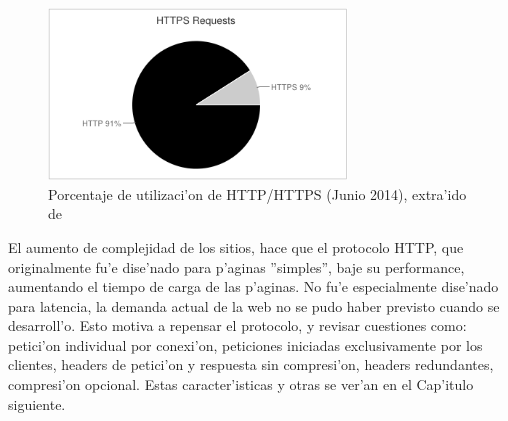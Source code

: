 \begin{figure}[h]
  	\centering
	\includegraphics[width=300px]{img/httphttps2014}
	\caption{\small Porcentaje de utilizaci'on de HTTP/HTTPS (Junio 2014), extra'ido de \cite{httparchive}}
	\label{httphttps2014}
\end{figure}

\clearpage

El aumento de complejidad de los sitios, hace que el protocolo HTTP, que originalmente fu'e dise'nado para p'aginas ''simples'', baje su performance, aumentando el tiempo de carga de las p'aginas. No fu'e especialmente dise'nado para latencia, la demanda actual de la web no se pudo haber previsto cuando se desarroll'o. Esto motiva a repensar el protocolo, y revisar cuestiones como: petici'on individual por conexi'on, peticiones iniciadas exclusivamente por los clientes, headers de petici'on y respuesta sin compresi'on, headers redundantes, compresi'on opcional. Estas caracter'isticas y otras se ver'an en el Cap'itulo siguiente.